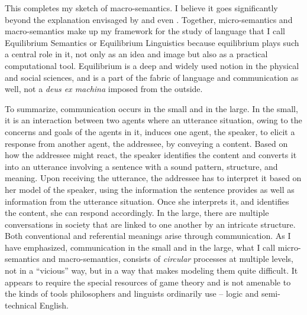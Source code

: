 This completes my sketch of macro-semantics. I believe it goes significantly beyond the explanation envisaged by \citet{grice:umsmwm} and even \citet{lewis:c, lewis:gs, lewis:ll}. Together, micro-semantics and macro-semantics make up my framework for the study of language that I call Equilibrium Semantics or Equilibrium Linguistics because equilibrium plays such a central role in it, not only as an idea and image but also as a practical computational tool. Equilibrium is a deep and widely used notion in the physical and social sciences, and is a part of the fabric of language and communication as well, not a \emph{deus ex machina} imposed from the outside.

To summarize, communication occurs in the small and in the large. In the small, it is an interaction between two agents where an utterance situation, owing to the concerns and goals of the agents in it, induces one agent, the speaker, to elicit a response from another agent, the addressee, by conveying a content. Based on how the addressee might react, the speaker identifies the content and converts it into an utterance involving a sentence with a sound pattern, structure, and meaning. Upon receiving the utterance, the addressee has to interpret it based on her model of the speaker, using the information the sentence provides as well as information from the utterance situation. Once she interprets it, and identifies the content, she can respond accordingly. In the large, there are multiple conversations in society that are linked to one another by an intricate structure. Both conventional and referential meanings arise through communication. As I have emphasized, communication in the small and in the large, what I call micro-semantics and macro-semantics, consists of \emph{circular} processes at multiple levels, not in a ``vicious'' way, but in a way that makes modeling them quite difficult. It appears to require the special resources of game theory and is not amenable to the kinds of tools philosophers and linguists ordinarily use -- logic and semi-technical English.

